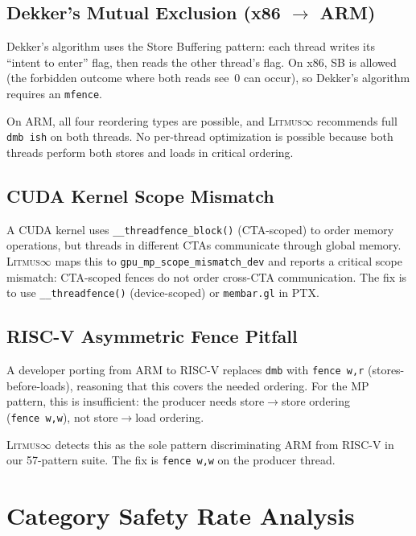 \documentclass[10pt]{article}
\newcommand{\litmus}{\textsc{Litmus$\infty$}}
\begin{document}
\subsection{Dekker's Mutual Exclusion (x86 $\to$ ARM)}

Dekker's algorithm uses the Store Buffering pattern: each thread
writes its ``intent to enter'' flag, then reads the other thread's flag.
On x86, SB is allowed (the forbidden outcome where both reads see~0
can occur), so Dekker's algorithm requires an \texttt{mfence}.

On ARM, all four reordering types are possible, and \litmus{} recommends
full \texttt{dmb~ish} on both threads. No per-thread optimization is
possible because both threads perform both stores and loads in critical
ordering.

\subsection{CUDA Kernel Scope Mismatch}

A CUDA kernel uses \texttt{\_\_threadfence\_block()} (CTA-scoped) to
order memory operations, but threads in different CTAs communicate
through global memory. \litmus{} maps this to
\texttt{gpu\_mp\_scope\_mismatch\_dev} and reports a critical scope
mismatch: CTA-scoped fences do not order cross-CTA communication.
The fix is to use \texttt{\_\_threadfence()} (device-scoped) or
\texttt{membar.gl} in PTX.

\subsection{RISC-V Asymmetric Fence Pitfall}

A developer porting from ARM to RISC-V replaces \texttt{dmb} with
\texttt{fence~w,r} (stores-before-loads), reasoning that this covers
the needed ordering. For the MP pattern, this is insufficient:
the producer needs store$\to$store ordering (\texttt{fence~w,w}),
not store$\to$load ordering.

\litmus{} detects this as the sole pattern discriminating ARM from
RISC-V in our 57-pattern suite. The fix is \texttt{fence~w,w} on
the producer thread.

\section{Category Safety Rate Analysis}
\label{app:categories}
\end{document}
